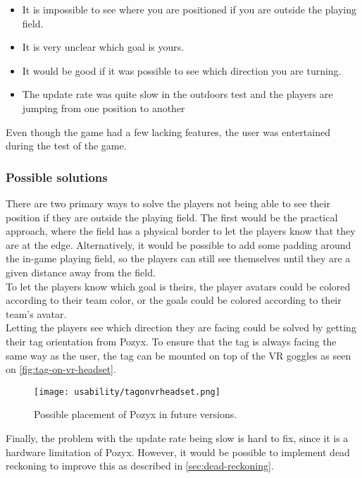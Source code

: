 \begin{itemize}
    \item It is impossible to see where you are positioned if you are outside the playing field.
    \item It is very unclear which goal is yours.
    \item It would be good if it was possible to see which direction you are turning.
    \item The update rate was quite slow in the outdoors test and the players are jumping from one position to another
\end{itemize}
Even though the game had a few lacking features, the user was entertained during the test of the game.

\subsubsection{Possible solutions}
There are two primary ways to solve the players not being able to see their position if they are outside the playing field.
The first would be the practical approach, where the field has a physical border to let the players know that they are at the edge.
Alternatively, it would be possible to add some padding around the in-game playing field, so the players can still see themselves until they are a given distance away from the field.
\\
To let the players know which goal is theirs, the player avatars could be colored according to their team color, or the goals could be colored according to their team's avatar.
\\
Letting the players see which direction they are facing could be solved by getting their tag orientation from Pozyx.
To ensure that the tag is always facing the same way as the user, the tag can be mounted on top of the VR goggles as seen on \autoref{fig:tag-on-vr-headset}.

\begin{figure}[H]
    \centering
    \texttt{[image: usability/tagonvrheadset.png]}
    \caption{Possible placement of Pozyx in future versions.}
    \label{fig:tag-on-vr-headset}
\end{figure}
\noindent
Finally, the problem with the update rate being slow is hard to fix, since it is a hardware limitation of Pozyx.
However, it would be possible to implement dead reckoning to improve this as described in \autoref{sec:dead-reckoning}.
